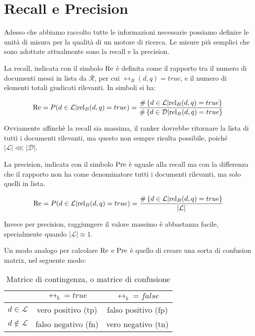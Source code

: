 \section{Recall e Precision}

Adesso che abbiamo raccolto tutte le informazioni necessarie possiamo definire
le unità di misura per la qualità di un motore di ricerca.
Le misure più semplici che sono adottate attualmente sono  la recall e la precision.

\begin{definizione}\label{def:recall}
	La recall, indicata con il simbolo $\text{Re}$ è definita come il rapporto tra il numero di documenti
	messi in lista da $\mathcal{R}$, per cui $\rel_B(d,q) = true$,
	e il numero di elementi totali giudicati rilevanti.
	In simboli si ha:
	
	$$
	\text{Re} = P(d \in \mathcal{L} | \text{rel}_B(d,q) = true) = \frac{
		\#\left\{ d \in \mathcal{L} | \text{rel}_B(d,q) = true\right\}
	}{
		\#\left\{ d \in \mathcal{D} | \text{rel}_B(d,q) = true\right\}
	}
	$$
\end{definizione}

Ovviamente affinchè la recall sia massima, il ranker dovrebbe ritornare la lista di tutti i documenti
rilevanti, ma questo non sempre risulta possibile, poiché $\left|\mathcal{L}\right| \lll \left|\mathcal{D}\right|$.

\begin{definizione}\label{def:precision}
	La precision, indicata con il simbolo $\text{Pre}$ è uguale alla recall
	ma con la differenza che il rapporto non ha come denominatore tutti i documenti
	rilevanti, ma solo quelli in lista.
	
	$$
	\text{Re} = P(d \in \mathcal{L} | \text{rel}_B(d,q) = true) = \frac{
		\#\left\{ d \in \mathcal{L} | \text{rel}_B(d,q) = true\right\}
	}{
		\left|\mathcal{L}\right|
	}
	$$
\end{definizione}
Invece per precision, raggiungere il valore massimo è abbastanza facile, specialmente quando $\left|\mathcal{L}\right| \approx 1$.

\pagebreak

Un modo analogo per calcolare $\text{Re}$ e $\text{Pre}$ è quello di creare una sorta di confusion
matrix, nel seguente modo:

\begin{table}[h!]
	\centering
	\begin{tabular}{|c|c|c|}
		\hline
		& $\rel_b = true$ & $\rel_b = false$ \\
		\hline
		$d \in \mathcal{L}$ &  vero positivo (tp) & falso positivo (fp) \\
		\hline
		$d \notin \mathcal{L}$ &  falso negativo (fn) & vero negativo (tn) \\
		\hline
	\end{tabular}
	\caption{Matrice di contingenza, o matrice di confusione}
\end{table}

